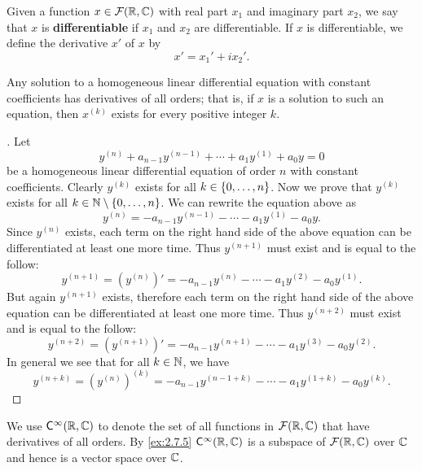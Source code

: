 \begin{defn}\label{2.7.3}
	Given a function \(x \in \mathcal{F}(\mathbb{R}, \mathbb{C})\) with real part \(x_1\) and imaginary part \(x_2\), we say that \(x\) is \textbf{differentiable} if \(x_1\) and \(x_2\) are differentiable.
	If \(x\) is differentiable, we define the derivative \(x'\) of \(x\) by
	\[
		x' = x_1' + i x_2'.
	\]
\end{defn}

\begin{thm}\label{2.27}
	Any solution to a homogeneous linear differential equation with constant coefficients has derivatives of all orders;
	that is, if \(x\) is a solution to such an equation, then \(x^{(k)}\) exists for every positive integer \(k\).
\end{thm}

\begin{proof}[]
	Let
	\[
		y^{(n)} + a_{n - 1} y^{(n - 1)} + \cdots + a_1 y^{(1)} + a_0 y = 0
	\]
	be a homogeneous linear differential equation of order \(n\) with constant coefficients.
	Clearly \(y^{(k)}\) exists for all \(k \in \left\lbrace0, \dots, n\right\rbrace\).
	Now we prove that \(y^{(k)}\) exists for all \(k \in \mathbb{N} \setminus \left\lbrace0, \dots, n\right\rbrace\).
	We can rewrite the equation above as
	\[
		y^{(n)} = -a_{n - 1} y^{(n - 1)} - \cdots - a_1 y^{(1)} - a_0 y.
	\]
	Since \(y^{(n)}\) exists, each term on the right hand side of the above equation can be differentiated at least one more time.
	Thus \(y^{(n + 1)}\) must exist and is equal to the follow:
	\[
		y^{(n + 1)} = (y^{(n)})' = -a_{n - 1} y^{(n)} - \cdots - a_1 y^{(2)} - a_0 y^{(1)}.
	\]
	But again \(y^{(n + 1)}\) exists, therefore each term on the right hand side of the above equation can be differentiated at least one more time.
	Thus \(y^{(n + 2)}\) must exist and is equal to the follow:
	\[
		y^{(n + 2)} = (y^{(n + 1)})' = -a_{n - 1} y^{(n + 1)} - \cdots - a_1 y^{(3)} - a_0 y^{(2)}.
	\]
	In general we see that for all \(k \in \mathbb{N}\), we have
	\[
		y^{(n + k)} = (y^{(n)})^{(k)} = -a_{n - 1} y^{(n - 1 + k)} - \cdots - a_1 y^{(1 + k)} - a_0 y^{(k)}.
	\]
\end{proof}

\begin{defn}\label{2.7.4}
	We use \(\cfs[\infty](\R, \C)\) to denote the set of all functions in \(\mathcal{F}(\mathbb{R}, \mathbb{C})\) that have derivatives of all orders.
	By \cref{ex:2.7.5} \(\cfs[\infty](\R, \C)\) is a subspace of \(\mathcal{F}(\mathbb{R}, \mathbb{C})\) over \(\mathbb{C}\) and hence is a vector space over \(\mathbb{C}\).
\end{defn}

